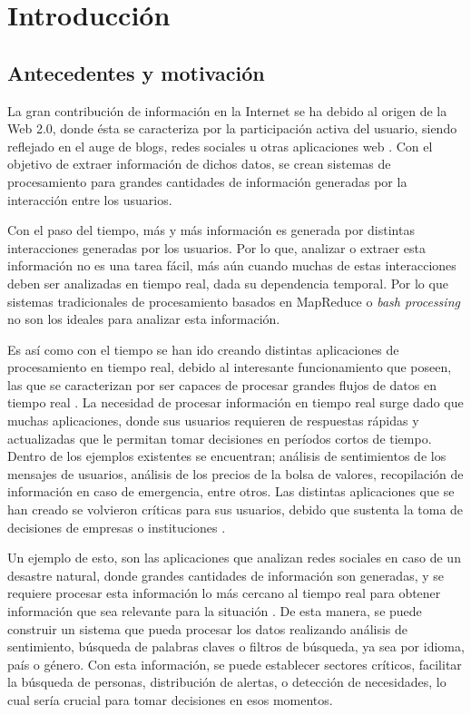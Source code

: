 \chapter{Introducción}
\label{cap:introduccion}

\section{Antecedentes y motivación}
\label{intro:motivacion}

La gran contribución de información en la Internet se ha debido al origen de la Web 2.0, donde ésta se caracteriza por la participación activa del usuario, siendo reflejado en el auge de blogs, redes sociales u otras aplicaciones web \citep{web2007oberhelman}. Con el objetivo de extraer información de dichos datos, se crean sistemas de procesamiento para grandes cantidades de información generadas por la interacción entre los usuarios.

Con el paso del tiempo, más y más información es generada por distintas interacciones generadas por los usuarios. Por lo que, analizar o extraer esta información no es una tarea fácil, más aún cuando muchas de estas interacciones deben ser analizadas en tiempo real, dada su dependencia temporal. Por lo que sistemas tradicionales de procesamiento basados en MapReduce \citep{2010Lin} o \textit{bash processing} \citep{HawwashN14} no son los ideales para analizar esta información.

Es así como con el tiempo se han ido creando distintas aplicaciones de procesamiento en tiempo real, debido al interesante funcionamiento que poseen, las que se caracterizan por ser capaces de procesar grandes flujos de datos en tiempo real \citep{ChenZ14a}. La necesidad de procesar informaci\'on en tiempo real surge dado que muchas aplicaciones, donde sus usuarios requieren de respuestas r\'apidas y actualizadas que le permitan tomar decisiones en per\'iodos cortos de tiempo. Dentro de los ejemplos existentes se encuentran; análisis de sentimientos de los mensajes de usuarios, análisis de los precios de la bolsa de valores, recopilación de información en caso de emergencia, entre otros. Las distintas aplicaciones que se han creado se volvieron críticas para sus usuarios, debido que sustenta la toma de decisiones de empresas o instituciones \citep{Wenzel14}.

Un ejemplo de esto, son las aplicaciones que analizan redes sociales en caso de un desastre natural, donde grandes cantidades de información son generadas, y se requiere procesar esta información lo más cercano al tiempo real para obtener información que sea relevante para la situación \citep{andrade2014fundamentals}. De esta manera, se puede construir un sistema que pueda procesar los datos realizando análisis de sentimiento, búsqueda de palabras claves o filtros de búsqueda, ya sea por idioma, país o género. Con esta información, se puede establecer sectores críticos, facilitar la búsqueda de personas, distribución de alertas, o detección de necesidades, lo cual sería crucial para tomar decisiones en esos momentos.

